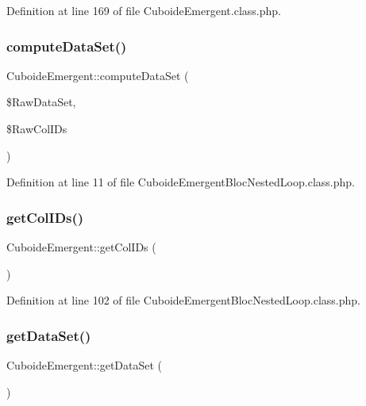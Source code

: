 Definition at line 169 of file Cuboide\+Emergent.\+class.\+php.

\mbox{\label{class_cuboide_emergent_a339e24b7edf88b70d3524586aad0198b}} 
\subsubsection{\texorpdfstring{compute\+Data\+Set()}{computeDataSet()}}
{\footnotesize\ttfamily Cuboide\+Emergent\+::compute\+Data\+Set (\begin{DoxyParamCaption}\item[{}]{\$\+Raw\+Data\+Set,  }\item[{}]{\$\+Raw\+Col\+I\+Ds }\end{DoxyParamCaption})\hspace{0.3cm}{\ttfamily [protected]}}



Definition at line 11 of file Cuboide\+Emergent\+Bloc\+Nested\+Loop.\+class.\+php.

\mbox{\label{class_cuboide_emergent_ad123a72b18f459e04cfdd809ea89e8f0}} 
\subsubsection{\texorpdfstring{get\+Col\+I\+Ds()}{getColIDs()}}
{\footnotesize\ttfamily Cuboide\+Emergent\+::get\+Col\+I\+Ds (\begin{DoxyParamCaption}{ }\end{DoxyParamCaption})}



Definition at line 102 of file Cuboide\+Emergent\+Bloc\+Nested\+Loop.\+class.\+php.

\mbox{\label{class_cuboide_emergent_a389c7cc353b142da7ed31dadf3598e68}} 
\subsubsection{\texorpdfstring{get\+Data\+Set()}{getDataSet()}}
{\footnotesize\ttfamily Cuboide\+Emergent\+::get\+Data\+Set (\begin{DoxyParamCaption}{ }\end{DoxyParamCaption})}




